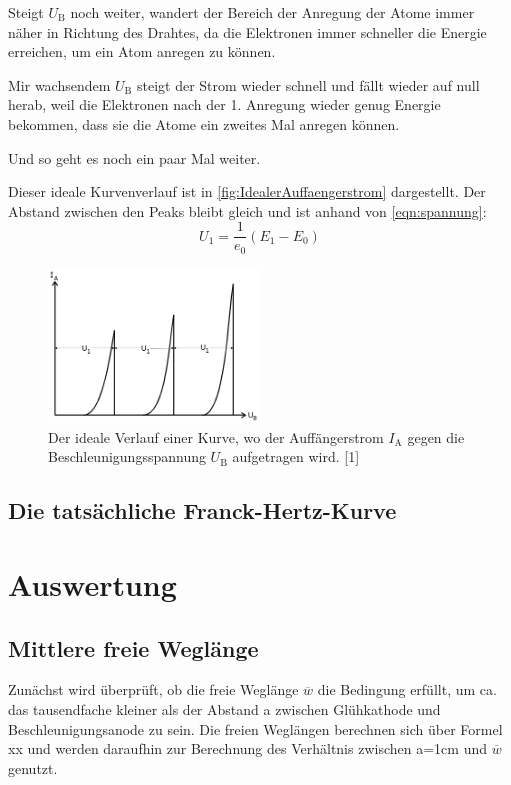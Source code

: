 \documentclass[titlepage = firstcover]{scrartcl}
\begin{document}
            Steigt $U_{\text{B}}$ noch weiter, wandert der Bereich der Anregung der Atome immer näher in Richtung des Drahtes, da die Elektronen immer schneller die Energie erreichen, um ein Atom anregen zu können.

            Mir wachsendem $U_{\text{B}}$ steigt der Strom wieder schnell und fällt wieder auf null herab, weil die Elektronen nach der 1. Anregung wieder genug Energie bekommen, dass sie die Atome ein zweites Mal anregen können.

            Und so geht es noch ein paar Mal weiter.

            Dieser ideale Kurvenverlauf ist in \autoref{fig:IdealerAuffaengerstrom} dargestellt. Der Abstand zwischen den Peaks bleibt gleich und ist anhand von \autoref{eqn:spannung}:
            \begin{equation*}
                U_{1} = \frac{1}{e_0}(E_1 - E_0)
            \end{equation*}

            \begin{figure}[h]
                \centering
                \includegraphics[width = 0.5\textwidth]{Bilder/IdealerAuffaengerstrom.png}
                \caption{Der ideale Verlauf einer Kurve, wo der Auffängerstrom $I_{\text{A}}$ gegen die Beschleunigungsspannung $U_{\text{B}}$ aufgetragen wird. [1]}
                \label{fig:IdealerAuffaengerstrom}
            \end{figure}

        \subsection{Die tatsächliche Franck-Hertz-Kurve}
            

    \section{Auswertung}    
        \subsection{Mittlere freie Weglänge}
            Zunächst wird überprüft, ob die freie Weglänge $\overline{w}$ die Bedingung erfüllt, um ca. das tausendfache kleiner als der Abstand a zwischen Glühkathode und Beschleunigungsanode zu sein.
            Die freien Weglängen berechnen sich über Formel xx und werden daraufhin zur Berechnung des Verhältnis zwischen a=1cm und $\overline{w}$ genutzt.
\end{document}
